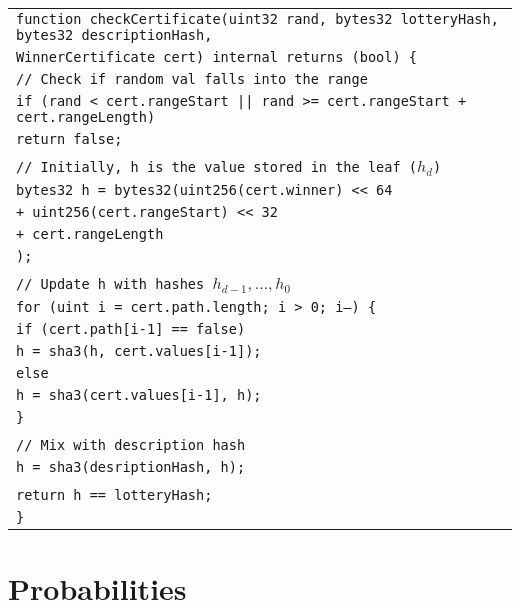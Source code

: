 \documentclass[a4paper]{article}
\begin{document}
    \begin{center}
        \begin{tabular}{l}
            \texttt{function checkCertificate(uint32 rand, bytes32 lotteryHash, bytes32 descriptionHash, }\\
            \qquad\qquad\qquad\qquad\qquad\qquad\qquad \texttt{WinnerCertificate cert) internal returns (bool) \{ }\\
            \qquad \texttt{// Check if random val falls into the range}\\
            \qquad \texttt{if (rand < cert.rangeStart || rand >= cert.rangeStart + cert.rangeLength)}\\
            \qquad\qquad \texttt{return false;}\\
            \\
            \qquad\texttt{// Initially, h is the value stored in the leaf ($h_d$)}\\
            \qquad \texttt{bytes32 h = bytes32(uint256(cert.winner) << 64}\\
            \qquad\qquad\qquad\qquad \texttt{+ uint256(cert.rangeStart) << 32}\\
            \qquad\qquad\qquad\qquad \texttt{+ cert.rangeLength}\\
            \qquad\qquad\qquad\qquad \texttt{);}\\
            \\
            \qquad \texttt{// Update h with hashes $h_{d-1}, \ldots, h_0$}\\
            \qquad\texttt{for (uint i = cert.path.length; i > 0; i--) \{}\\
            \qquad\qquad \texttt{if (cert.path[i-1] == false)}\\
            \qquad\qquad\qquad \texttt{h = sha3(h, cert.values[i-1]);}\\
            \qquad\qquad \texttt{else}\\
            \qquad\qquad\qquad\texttt{h = sha3(cert.values[i-1], h);}\\
            \qquad\texttt{\}}\\
            \\
            \qquad\texttt{// Mix with description hash}\\
            \qquad\texttt{h = sha3(desriptionHash, h);}\\
            \\
            \qquad\texttt{return h == lotteryHash;}\\
            \texttt{\}}
        \end{tabular}
    \end{center}

\section{Probabilities}
\end{document}
